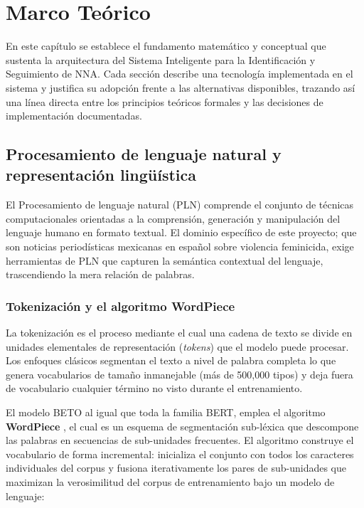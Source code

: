 
\chapter{Marco Teórico}
\label{cap:marcoteorico}

En este capítulo se establece el fundamento matemático y conceptual que sustenta
la arquitectura del Sistema Inteligente para la Identificación y
Seguimiento de NNA. Cada sección describe una tecnología implementada en el sistema
y justifica su adopción frente a las alternativas disponibles, trazando así una línea
directa entre los principios teóricos formales y las decisiones de implementación
documentadas.

\section{Procesamiento de lenguaje natural y representación lingüística}
\label{sec:mt_pln}

El Procesamiento de lenguaje natural (PLN) comprende el conjunto de técnicas
computacionales orientadas a la comprensión, generación y manipulación del lenguaje
humano en formato textual. El dominio específico de este proyecto; que son noticias
periodísticas mexicanas en español sobre violencia feminicida, exige herramientas
de PLN que capturen la semántica contextual del lenguaje, trascendiendo la mera
relación de palabras.

\subsection{Tokenización y el algoritmo WordPiece}
\label{subsec:mt_tokenizacion}

La tokenización es el proceso mediante el cual una cadena de texto se divide en
unidades elementales de representación (\textit{tokens}) que el modelo puede procesar.
Los enfoques clásicos segmentan el texto a nivel de palabra completa lo que genera
vocabularios de tamaño inmanejable (más de 500{,}000 tipos) y deja fuera de vocabulario
cualquier término no visto durante el entrenamiento.

El modelo BETO al igual que toda la familia BERT, emplea el algoritmo
\textbf{WordPiece} \cite{schuster2012wordpiece}, el cual es un esquema de segmentación
sub-léxica que descompone las palabras en secuencias de sub-unidades frecuentes.
El algoritmo construye el vocabulario de forma incremental: inicializa el conjunto
con todos los caracteres individuales del corpus y fusiona iterativamente los pares
de sub-unidades que maximizan la verosimilitud del corpus de entrenamiento bajo un
modelo de lenguaje:

